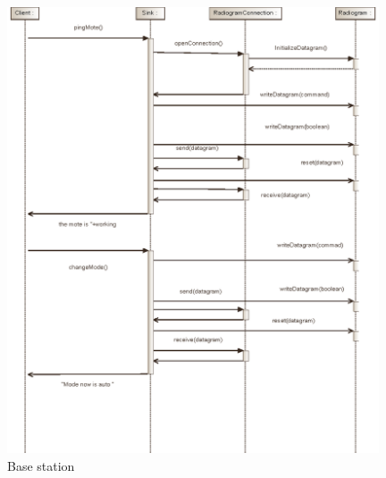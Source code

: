 \documentclass[UKenglish,10pt,a4paper]{report}
\begin{document}
\begin{figure}[!ht]
	\caption{Base station}
	\label{fig:basestation}

	\centering
	\includegraphics[width=0.98\textwidth]{img/BaseStation.eps}
\end{figure}
\end{document}
